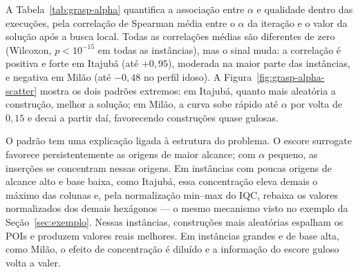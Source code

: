 \documentclass[11pt,a4paper]{article}
\begin{document}
A Tabela~\ref{tab:grasp-alpha} quantifica a associação entre $\alpha$ e qualidade dentro das execuções, pela correlação de Spearman média entre o $\alpha$ da iteração e o valor da solução após a busca local. Todas as correlações médias são diferentes de zero (Wilcoxon, $p < 10^{-15}$ em todas as instâncias), mas o sinal muda: a correlação é positiva e forte em Itajubá (até $+0{,}95$), moderada na maior parte das instâncias, e negativa em Milão (até $-0{,}48$ no perfil idoso). A Figura~\ref{fig:grasp-alpha-scatter} mostra os dois padrões extremos: em Itajubá, quanto mais aleatória a construção, melhor a solução; em Milão, a curva sobe rápido até $\alpha$ por volta de $0{,}15$ e decai a partir daí, favorecendo construções quase gulosas.

O padrão tem uma explicação ligada à estrutura do problema. O escore surrogate favorece persistentemente as origens de maior alcance; com $\alpha$ pequeno, as inserções se concentram nessas origens. Em instâncias com poucas origens de alcance alto e base baixa, como Itajubá, essa concentração eleva demais o máximo das colunas e, pela normalização min--max do IQC, rebaixa os valores normalizados dos demais hexágonos — o mesmo mecanismo visto no exemplo da Seção~\ref{sec:exemplo}. Nessas instâncias, construções mais aleatórias espalham os POIs e produzem valores reais melhores. Em instâncias grandes e de base alta, como Milão, o efeito de concentração é diluído e a informação do escore guloso volta a valer.
\end{document}
